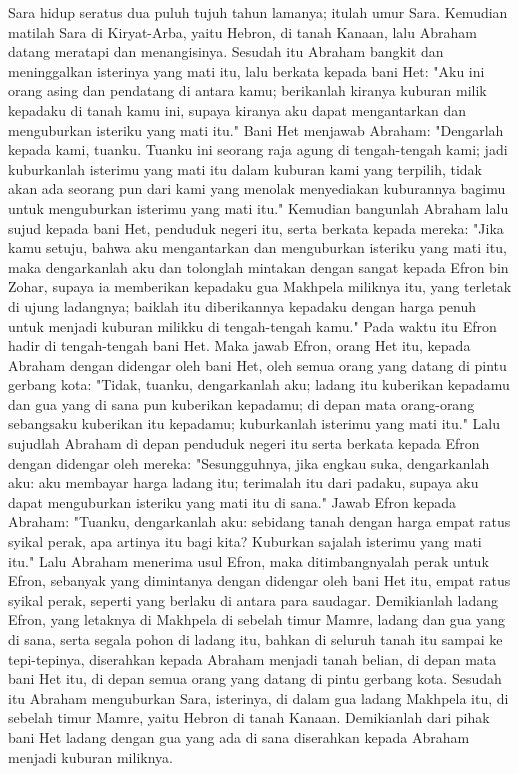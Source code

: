 \begin{biblechapter} %
 Sara hidup seratus dua puluh tujuh tahun lamanya; itulah umur Sara.
\verse Kemudian matilah Sara di Kiryat-Arba, yaitu Hebron, di tanah Kanaan, lalu Abraham datang meratapi dan menangisinya.
\verse Sesudah itu Abraham bangkit dan meninggalkan isterinya yang mati itu, lalu berkata kepada bani Het:
\verse "Aku ini orang asing dan pendatang di antara kamu; berikanlah kiranya kuburan milik kepadaku di tanah kamu ini, supaya kiranya aku dapat mengantarkan dan menguburkan isteriku yang mati itu."
\verse Bani Het menjawab Abraham:
\verse "Dengarlah kepada kami, tuanku. Tuanku ini seorang raja agung di tengah-tengah kami; jadi kuburkanlah isterimu yang mati itu dalam kuburan kami yang terpilih, tidak akan ada seorang pun dari kami yang menolak menyediakan kuburannya bagimu untuk menguburkan isterimu yang mati itu."
\verse Kemudian bangunlah Abraham lalu sujud kepada bani Het, penduduk negeri itu,
\verse serta berkata kepada mereka: "Jika kamu setuju, bahwa aku mengantarkan dan menguburkan isteriku yang mati itu, maka dengarkanlah aku dan tolonglah mintakan dengan sangat kepada Efron bin Zohar,
\verse supaya ia memberikan kepadaku gua Makhpela miliknya itu, yang terletak di ujung ladangnya; baiklah itu diberikannya kepadaku dengan harga penuh untuk menjadi kuburan milikku di tengah-tengah kamu."
\verse Pada waktu itu Efron hadir di tengah-tengah bani Het. Maka jawab Efron, orang Het itu, kepada Abraham dengan didengar oleh bani Het, oleh semua orang yang datang di pintu gerbang kota:
\verse "Tidak, tuanku, dengarkanlah aku; ladang itu kuberikan kepadamu dan gua yang di sana pun kuberikan kepadamu; di depan mata orang-orang sebangsaku kuberikan itu kepadamu; kuburkanlah isterimu yang mati itu."
\verse Lalu sujudlah Abraham di depan penduduk negeri itu
\verse serta berkata kepada Efron dengan didengar oleh mereka: "Sesungguhnya, jika engkau suka, dengarkanlah aku: aku membayar harga ladang itu; terimalah itu dari padaku, supaya aku dapat menguburkan isteriku yang mati itu di sana."
\verse Jawab Efron kepada Abraham:
\verse "Tuanku, dengarkanlah aku: sebidang tanah dengan harga empat ratus syikal perak, apa artinya itu bagi kita? Kuburkan sajalah isterimu yang mati itu."
\verse Lalu Abraham menerima usul Efron, maka ditimbangnyalah perak untuk Efron, sebanyak yang dimintanya dengan didengar oleh bani Het itu, empat ratus syikal perak, seperti yang berlaku di antara para saudagar.
\verse Demikianlah ladang Efron, yang letaknya di Makhpela di sebelah timur Mamre, ladang dan gua yang di sana, serta segala pohon di ladang itu, bahkan di seluruh tanah itu sampai ke tepi-tepinya,
\verse diserahkan kepada Abraham menjadi tanah belian, di depan mata bani Het itu, di depan semua orang yang datang di pintu gerbang kota.
\verse Sesudah itu Abraham menguburkan Sara, isterinya, di dalam gua ladang Makhpela itu, di sebelah timur Mamre, yaitu Hebron di tanah Kanaan.
\verse Demikianlah dari pihak bani Het ladang dengan gua yang ada di sana diserahkan kepada Abraham menjadi kuburan miliknya.
\end{biblechapter}

